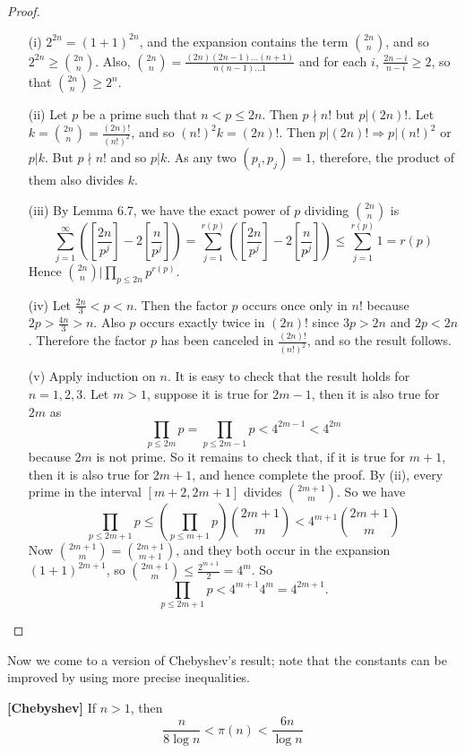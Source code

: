 \begin{proof}
\begin{enumerate}
\item[(i)] $2^{2n}=(1+1)^{2n}$, and the expansion contains the term $\binom{2n}{n}$, and so
$2^{2n} \ge \binom{2n}{n}$. Also, $\binom{2n}{n}=\frac{(2n)(2n-1)\ldots(n+1)}{n(n-1)\ldots 1}$
and for each $i$, $\frac{2n-i}{n-i}\ge 2$, so that $\binom{2n}{n} \ge 2^n$.
\item[(ii)] Let $p$ be a prime such that $n<p \le 2n$. Then $p \nmid n!$ but $p \big|(2n)!$.
Let $k=\binom{2n}{n}=\frac{(2n)!}{(n!)^2}$, and so $(n!)^2 k=(2n)!$. Then
$p \big| (2n)! \Rightarrow p\big| (n!)^2$ or $p \big| k$. But $p \nmid n!$ and so $p \big| k$.
As any two $(p_i,p_j)=1$, therefore, the product of them also divides $k$.
\item[(iii)] By Lemma 6.7, we have the exact power of $p$ dividing $\binom{2n}{n}$ is
$$\sum_{j=1}^{\infty} \left(\left[\frac{2n}{p^j}\right]-2 \left[\frac{n}{p^j}\right]\right)
=\sum_{j=1}^{r(p)}\left(\left[\frac{2n}{p^j}\right]-2\left[\frac{n}{p^j}\right]\right)
\le \sum_{j=1}^{r(p)} 1 =r(p)$$
Hence $\binom{2n}{n} \big| \prod_{p \le 2n}p^{r(p)}$.
\item[(iv)] Let $\frac{2n}{3} < p <n$.  Then the factor $p$ occurs once only in $n!$ because
$2p > \frac{4n}{3} >n$. Also $p$ occurs exactly twice in $(2n)!$ since $3p>2n$ and $2p <2n$.
Therefore the factor $p$ has been canceled in $\frac{(2n)!}{(n!)^2}$, and so the result follows.
\item[(v)] Apply induction on $n$. It is easy to check that the result holds for $n=1,2,3$.
Let $m>1$, suppose it is true for $2m-1$, then it is also true for $2m$ as
$$\prod_{p \le 2m}p=\prod_{p \le 2m-1}p <4^{2m-1}<4^{2m}$$
because $2m$ is not prime. So it remains to check that, if it is true for $m+1$, then it is also true for $2m+1$, and hence complete the proof. By (ii), every prime in the interval $[m+2,2m+1]$ divides
$\binom{2m+1}{m}$. So we have
$$\prod_{p \le 2m+1}p \le \left(\prod_{p \le m+1}p\right) \binom{2m+1}{m}
<4^{m+1} \binom{2m+1}{m}$$
Now $\binom{2m+1}{m}=\binom{2m+1}{m+1}$, and they both occur in the expansion
$(1+1)^{2m+1}$, so $\binom{2m+1}{m} \le \frac{2^{m+1}}{2}=4^m$.
So $$\prod_{p \le 2m+1} p < 4^{m+1}4^m=4^{2m+1}.$$
\end{enumerate}
\end{proof}
Now we come to a version of Chebyshev's result; note that the constants can be improved by using more
precise inequalities.
\begin{theorem}{\bf [Chebyshev]}\label{C;Chebyshev}
If $n>1$, then
$$\frac{n}{8\log{n}}<\pi(n)<\frac{6n}{\log{n}}$$
\end{theorem}
